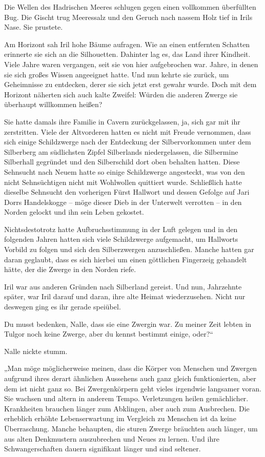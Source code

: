 Die Wellen des Hadrischen Meeres schlugen gegen einen vollkommen überfüllten Bug. Die Gischt trug Meeressalz und den Geruch nach nassem Holz tief in Irils Nase. Sie prustete.

Am Horizont sah Iril hohe Bäume aufragen. Wie an einen entfernten Schatten erinnerte sie sich an die Silhouetten. Dahinter lag es, das Land ihrer Kindheit. Viele Jahre waren vergangen, seit sie von hier aufgebrochen war. Jahre, in denen sie sich großes Wissen angeeignet hatte. Und nun kehrte sie zurück, um Geheimnisse zu entdecken, derer sie sich jetzt erst gewahr wurde. Doch mit dem Horizont näherten sich auch kalte Zweifel: Würden die anderen Zwerge sie überhaupt willkommen heißen?

Sie hatte damals ihre Familie in Cavern zurückgelassen, ja, sich gar mit ihr zerstritten. Viele der Altvorderen hatten es nicht mit Freude vernommen, dass sich einige Schildzwerge nach der Entdeckung der Silbervorkommen unter dem Silberberg am südlichsten Zipfel Silberlands niedergelassen, die Silbermine Silberhall gegründet und den Silberschild dort oben behalten hatten. Diese Sehnsucht nach Neuem hatte so einige Schildzwerge angesteckt, was von den nicht Sehnsüchtigen nicht mit Wohlwollen quittiert wurde. Schließlich hatte dieselbe Sehnsucht den vorherigen Fürst Hallwort und dessen Gefolge auf Jari Dorrs Handelskogge – möge dieser Dieb in der Unterwelt verrotten – in den Norden gelockt und ihn sein Leben gekostet.

Nichtsdestotrotz hatte Aufbruchsstimmung in der Luft gelegen und in den folgenden Jahren hatten sich viele Schildzwerge aufgemacht, um Hallworts Vorbild zu folgen und sich den Silberzwergen anzuschließen. Manche hatten gar daran geglaubt, dass es sich hierbei um einen göttlichen Fingerzeig gehandelt hätte, der die Zwerge in den Norden riefe.

Iril war aus anderen Gründen nach Silberland gereist. Und nun, Jahrzehnte später, war Iril darauf und daran, ihre alte Heimat wiederzusehen. Nicht nur deswegen ging es ihr gerade speiübel.

Du musst bedenken, Nalle, dass sie eine Zwergin war. Zu meiner Zeit lebten in Tulgor noch keine Zwerge, aber du kennst bestimmt einige, oder?“

Nalle nickte stumm.

„Man möge möglicherweise meinen, dass die Körper von Menschen und Zwergen aufgrund ihres derart ähnlichen Aussehens auch ganz gleich funktionierten, aber dem ist nicht ganz so. Bei Zwergenkörpern geht vieles irgendwie langsamer voran. Sie wachsen und altern in anderem Tempo. Verletzungen heilen gemächlicher. Krankheiten brauchen länger zum Abklingen, aber auch zum Ausbrechen. Die erheblich erhöhte Lebenserwartung im Vergleich zu Menschen ist da keine Überraschung. Manche behaupten, die sturen Zwerge bräuchten auch länger, um aus alten Denkmustern auszubrechen und Neues zu lernen. Und ihre Schwangerschaften dauern signifikant länger und sind seltener.

